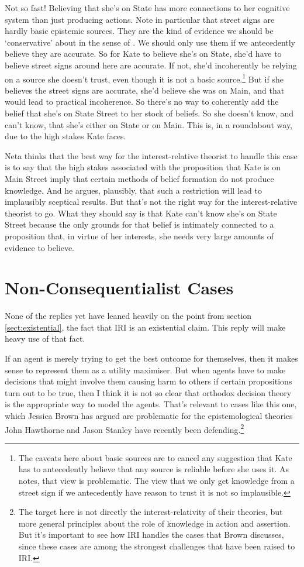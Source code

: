 \documentclass[oneside, a4paper]{book}
\begin{document}
Not so fast! Believing that she's on State has more connections to her cognitive system than just producing actions. Note in particular that street signs are hardly basic epistemic sources. They are the kind of evidence we should be `conservative' about in the sense of \cite{Pryor2004-PRYWWW}. We should only use them if we antecedently believe they are accurate. So for Kate to believe she's on State, she'd have to believe street signs around here are accurate. If not, she'd incoherently be relying on a source she doesn't trust, even though it is not a basic source.\footnote{The caveats here about basic sources are to cancel any suggestion that Kate has to antecedently believe that any source is reliable before she uses it. As \cite{Pryor2000-PRYTSA} notes, that view is problematic. The view that we only get knowledge from a street sign if we antecedently have reason to trust it is not so implausible.} But if she believes the street signs are accurate, she'd believe she was on Main, and that would lead to practical incoherence. So there's no way to coherently add the belief that she's on State Street to her stock of beliefs. So she doesn't know, and can't know, that she's either on State or on Main. This is, in a roundabout way, due to the high stakes Kate faces.

Neta thinks that the best way for the interest-relative theorist to handle this case is to say that the high stakes associated with the proposition that Kate is on Main Street imply that certain methods of belief formation do not produce knowledge. And he argues, plausibly, that such a restriction will lead to implausibly sceptical results. But that's not the right way for the interest-relative theorist to go. What they should say is that Kate can't know she's on State Street because the only grounds for that belief is intimately connected to a proposition that, in virtue of her interests, she needs very large amounts of evidence to believe.

\section{Non-Consequentialist Cases}
None of the replies yet have leaned heavily on the point from section \ref{sect:existential}, the fact that IRI is an existential claim. This reply will make heavy use of that fact.

If an agent is merely trying to get the best outcome for themselves, then it makes sense to represent them as a utility maximiser. But when agents have to make decisions that might involve them causing harm to others if certain propositions turn out to be true, then I think it is not so clear that orthodox decision theory is the appropriate way to model the agents. That's relevant to cases like this one, which Jessica Brown has argued are problematic for the epistemological theories John Hawthorne and Jason Stanley have recently been defending.\footnote{The target here is not directly the interest-relativity of their theories, but more general principles about the role of knowledge in action and assertion. But it's important to see how IRI handles the cases that Brown discusses, since these cases are among the strongest challenges that have been raised to IRI.}
\end{document}
